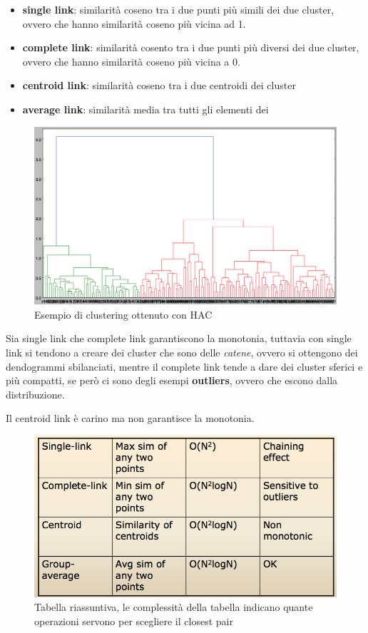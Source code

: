\begin{itemize}
	\item
	\textbf{single link}: similarità coseno tra i due punti più simili dei due cluster, ovvero che hanno similarità coseno più vicina ad 1.
	\item
	\textbf{complete link}: similarità cosento tra i due punti più diversi dei due cluster, ovvero che hanno similarità coseno più vicina a 0.
	\item
	\textbf{centroid link}: similarità coseno tra i due centroidi dei cluster
	\item
	\textbf{average link}: similarità media tra tutti gli elementi dei 
\end{itemize}

\begin{figure}[htbp]
\centering
\includegraphics[width=\textwidth]{./notes/immagini/l17-dendogram-cluster.png}
\caption{Esempio di clustering ottenuto con HAC}
\end{figure}

Sia single link che complete link garantiscono la monotonia, tuttavia
con single link si tendono a creare dei cluster che sono delle
\emph{catene}, ovvero si ottengono dei dendogrammi sbilanciati, mentre
il complete link tende a dare dei cluster sferici e più compatti, se
però ci sono degli esempi \textbf{outliers}, ovvero che escono dalla
distribuzione.

Il centroid link è carino ma non garantisce la monotonia.

\begin{figure}[htbp]
\centering
\includegraphics[width=\textwidth]{./notes/immagini/l17-riassunto.png}
\caption{Tabella riassuntiva, le complessità della tabella indicano quante operazioni servono per
	scegliere il closest pair}
\end{figure}
